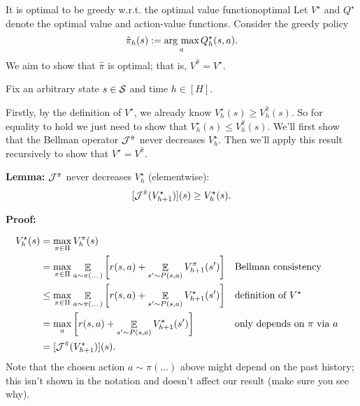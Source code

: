 \documentclass[../main/main]{subfiles}
\begin{document}
\begin{theorem}{It is optimal to be greedy w.r.t. the optimal value function}{optimal}
    Let $V^{\star}$ and $Q^{\star}$ denote the optimal value and action-value functions. Consider the greedy policy
    \[
        \hat \pi_h(s) := \argmax_a Q_h^{\star}(s, a).
    \]
    We aim to show that $\hat \pi$ is optimal; that is, $V^{\hat \pi} = V^{\star}$.

    Fix an arbitrary state $s \in \S$ and time $h \in [H]$.

    Firstly, by the definition of $V^{\star}$, we already know $V_h^{\star}(s) \ge V_h^{\hat \pi}(s)$. So for equality to hold we just need to show that $V_h^{\star}(s) \le V_h^{\hat \pi}(s)$. We'll first show that the Bellman operator $\bop^{\hat \pi}$ never decreases $V_h^{\star}$. Then we'll apply this result recursively to show that $V^{\star} = V^{\hat \pi}$.
    
    \textbf{Lemma:} $\bop^{\hat \pi}$ never decreases $V_h^{\star}$ (elementwise):
    \[
        [\bop^{\hat \pi} (V_{h+1}^{\star})](s) \ge V_h^{\star}(s).
    \]
    
    \textbf{Proof:}
    
    \begin{align*}
    V_h^{\star}(s) &= \max_{\pi \in \Pi} V_h^{\pi}(s) \\
    &= \max_{\pi \in \Pi} \mathop{\mathbb{E}}_{a \sim \pi(\dots)}\left[r(s, a) + \mathop{\mathbb{E}}_{s' \sim P(s, a)} V_{h+1}^\pi(s') \right] && \text{Bellman consistency} \\
    &\le \max_{\pi \in \Pi} \mathop{\mathbb{E}}_{a \sim \pi(\dots)}\left[r(s, a) + \mathop{\mathbb{E}}_{s' \sim P(s, a)} V_{h+1}^{\star}(s') \right] && \text{definition of } V^\star \\
    &= \max_{a} \left[ r(s, a) + \mathop{\mathbb{E}}_{s' \sim P(s, a)} V_{h+1}^{\star}(s') \right] && \text{only depends on } \pi \text{ via } a \\
    &= [\bop^{\hat \pi}(V_{h+1}^{\star})](s).
    \end{align*}
    Note that the chosen action $a \sim \pi(\dots)$ above might depend on the past history; this isn't shown in the notation and doesn't affect our result (make sure you see why).
    

\end{theorem}
\end{document}
